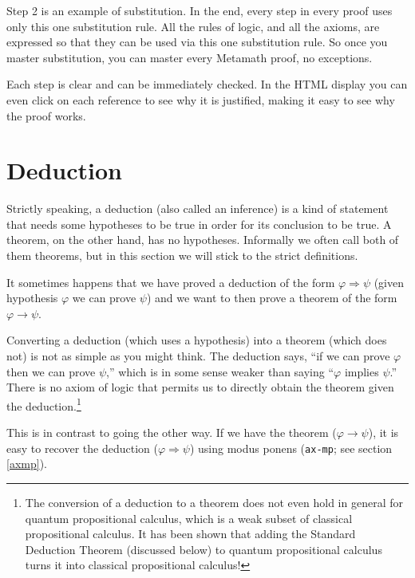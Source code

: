 Step 2 is an example of substitution.
In the end, every step in every proof uses only this one substitution rule.
All the rules of logic, and all the axioms, are expressed so that
they can be used via this one substitution rule.
So once you master substitution, you can master every Metamath proof,
no exceptions.

Each step is clear and can be immediately checked.
In the HTML display you can even click on each reference to see why it is
justified, making it easy to see why the proof works.

\section{Deduction}\label{deduction}

Strictly speaking,
a deduction (also called an inference) is a kind of statement that needs
some hypotheses to be true in order for its conclusion to be true.
A theorem, on the other hand, has no hypotheses.
Informally we often call both of them theorems, but in this section we
will stick to the strict definitions.

It sometimes happens that we have proved a deduction of the form
$\varphi \Rightarrow \psi$\index{$\Rightarrow$}
(given hypothesis $\varphi$ we can prove $\psi$)
and we want to then prove a theorem of the form
$\varphi \rightarrow \psi$.

Converting a deduction (which uses a hypothesis) into a theorem
(which does not) is not as simple as you might think.
The deduction says, ``if we can prove $\varphi$ then we can prove $\psi$,''
which is in some sense weaker than saying
``$\varphi$ implies $\psi$.''
There is no axiom of logic that permits us to directly obtain the theorem
given the deduction.\footnote{
The conversion of a deduction to a theorem does not even hold in general
for quantum propositional calculus,
which is a weak subset of classical propositional calculus.
It has been shown that adding the Standard Deduction Theorem (discussed below)
to quantum propositional calculus turns it into classical
propositional calculus!
}

This is in contrast to going the other way.
If we have the theorem ($\varphi \rightarrow \psi$),
it is easy to recover the deduction
($\varphi \Rightarrow \psi$)
using modus ponens
(\texttt{ax-mp}; see section \ref{axmp}).

